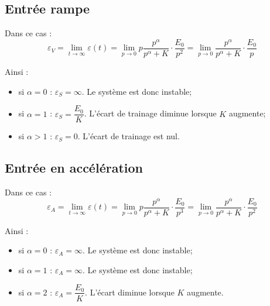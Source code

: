 \documentclass[10pt,oneside]{article}
\begin{document}
\subsection{Entrée rampe}
Dans ce cas : 
$$
\varepsilon_V =
\lim\limits_{t\to \infty} \varepsilon(t) 
= \lim\limits_{p\to 0} p \dfrac{p^\alpha}{p^\alpha+K} \cdot \dfrac{E_0}{p^2}
= \lim\limits_{p\to 0}  \dfrac{p^\alpha}{p^\alpha+K} \cdot \dfrac{E_0}{p}
$$

Ainsi :
\begin{itemize}
\item si $\alpha=0$ : $\varepsilon_S = \infty$. Le système est donc instable;
\item si $\alpha=1$ : $\varepsilon_S = \dfrac{E_0}{K}$. L'écart de trainage diminue lorsque $K$ augmente;
\item si $\alpha>1$ : $\varepsilon_S = 0$. L'écart de trainage est nul.
\end{itemize}

\begin{exemple}


\end{exemple}



\subsection{Entrée en accélération}
Dans ce cas : 
$$
\varepsilon_A =
\lim\limits_{t\to \infty} \varepsilon(t) 
= \lim\limits_{p\to 0} p \dfrac{p^\alpha}{p^\alpha+K} \cdot \dfrac{E_0}{p^3}
= \lim\limits_{p\to 0}  \dfrac{p^\alpha}{p^\alpha+K} \cdot \dfrac{E_0}{p^2}
$$

Ainsi :
\begin{itemize}
\item si $\alpha=0$ : $\varepsilon_A = \infty$. Le système est donc instable;
\item si $\alpha=1$ : $\varepsilon_A = \infty$. Le système est donc instable;
\item si $\alpha=2$ : $\varepsilon_A = \dfrac{E_0}{K}$. L'écart diminue lorsque $K$ augmente.
\end{itemize}
\end{document}
